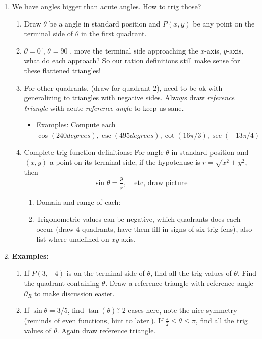 \documentclass{article}
\begin{document}
\begin{enumerate}

\item We have angles bigger than acute angles. How to trig those? 
\begin{enumerate}
\item Draw $\theta$ be a angle in standard position and $P(x,y)$ be any point on the terminal side of $\theta$ in the first quadrant.
\item $\theta = 0^{\circ}$, $\theta = 90^{\circ}$, move the terminal side approaching the $x$-axis, $y$-axis, what do each approach? So our ration definitions still make sense for these flattened triangles!
\item For other quadrants, (draw for quadrant 2), need to be ok with generalizing to triangles with negative sides. Always draw \emph{reference triangle} with acute \emph{reference angle} to keep us sane.
\begin{itemize}
\item Examples: Compute each $\cos(240 degrees), \csc(495 degrees), \cot(16\pi/3), \sec(-13\pi/4)$
\end{itemize}
\item Complete trig function definitions: For angle $\theta$ in standard position and $(x,y)$ a point on its terminal side, if the hypotenuse is $r = \sqrt{x^2+y^2}$, then 
$$
\sin \theta = \frac{y}{r}, \quad \text{etc, draw picture}
$$
\begin{enumerate}
\item Domain and range of each:
\item Trigonometric values can be negative, which quadrants does each occur (draw 4 quadrants, have them fill in signs of six trig fcns), also list where undefined on $xy$ axis.
\end{enumerate}
\end{enumerate}

\item {\bf Examples:}
\begin{enumerate}
\item If $P(3,-4)$ is on the terminal side of $\theta$, find all the trig values of $\theta$. Find the quadrant containing $\theta $. Draw a reference triangle with reference angle $\theta_R$ to make discussion easier.
\item If $\sin \theta = 3/5$, find $\tan(\theta)$? 2 cases here, note the nice symmetry (reminds of even functions, hint to later.). If $\frac{\pi}{2}\leq \theta\leq \pi$, find all the trig values of $\theta$. Again draw reference triangle.
\end{enumerate}


\end{enumerate}
\end{document}
